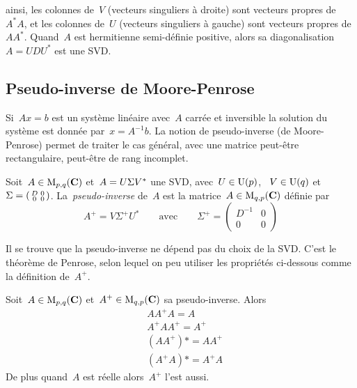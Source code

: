 ainsi, les colonnes de~$V$ (vecteurs singuliers à droite) sont vecteurs
propres de~$A^*A$, et les colonnes de~$U$ (vecteurs singuliers à gauche) sont
vecteurs propres de~$AA^*$.
Quand~$A$ est hermitienne semi-définie positive, alors sa
diagonalisation~$A=UDU^*$ est une SVD.


\subsection{Pseudo-inverse de Moore-Penrose}

Si~$Ax=b$ est un système linéaire avec~$A$ carrée et inversible la solution
du système est donnée par~$x=A^{-1}b$.  La notion de pseudo-inverse (de
Moore-Penrose) permet de traiter le cas général, avec une matrice peut-être
rectangulaire, peut-être de rang incomplet.

\begin{definition}
	\label{def:pseudoinv}
	Soit~$A\in\mathrm{M}_{p,q}(\mathbf{C})$ et~$A=U\/\Sigma V^*$ une SVD,
	avec~$U\in\mathrm{U}(p)$, ~$V\in\mathrm{U}(q)$
	et~$\Sigma=\left(\begin{smallmatrix}D&0\\0&0\end{smallmatrix}\right)$.
	La~\emph{pseudo-inverse} de~$A$ est la matrice~$A\in\mathrm{M}_{q,p}(\mathbf{C})$ définie
	par
	\[
		A^+=V\Sigma^+ U^*
		\qquad
		\textrm{avec}
		\qquad
		\Sigma^+=\begin{pmatrix}D^{-1}&0\\0&0\end{pmatrix}
	\]
\end{definition}

\begin{remark}
	Il se trouve que la pseudo-inverse ne dépend pas du choix de la SVD.
	C'est le théorème de Penrose, selon lequel on peu utiliser les
	propriétés ci-dessous comme la définition de~$A^+$.
\end{remark}

\begin{exercice}
	\label{ex:pseudoinv}
	Soit~$A\in\mathrm{M}_{p,q}(\mathbf{C})$ et~$A^+\in\mathrm{M}_{q,p}(\mathbf{C})$ sa pseudo-inverse.  Alors
	\begin{align*}
		& AA^+A=A \\
		& A^+AA^+=A^+ \\
		& (AA^+)*=AA^+ \\
		& (A^+A)*=A^+A
	\end{align*}
	De plus quand~$A$ est réelle alors~$A^+$ l'est aussi.
\end{exercice}

